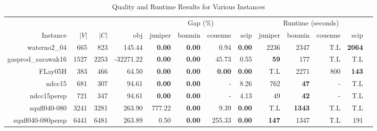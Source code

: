 \begin{landscape} 
\begin{table*}[t] 
\footnotesize 
\caption{Quality and Runtime Results for Various Instances} 
\begin{tabular}{|r|r|r||r||r|r|r|r||r|r|r|r|r|} 
\hline 
                        &     &       &             & \multicolumn{4}{c||}{Gap (\%)} &  \multicolumn{4}{c|}{Runtime (seconds)} \\ 
    Instance              & $|V|$& $|C|$& obj         & juniper    & bonmin & couenne        & scip            & juniper          & bonmin            & couenne         & scip \\ 
    \hline 
    \hline 
                        waterno2\_04 &           665 &           823 &                            145.44 &  \textbf{0.00} &  \textbf{0.00} &           0.94 &  \textbf{0.00} &               2236 &               2347 &                T.L &      \textbf{2064} \\ 
                  gasprod\_sarawak16 &          1527 &          2253 &                         -32271.22 &  \textbf{0.00} &  \textbf{0.00} &          45.73 &           0.55 &        \textbf{59} &                177 &                T.L &                T.L \\ 
                             FLay05H &           383 &           466 &                             64.50 &  \textbf{0.00} &  \textbf{0.00} &  \textbf{0.00} &  \textbf{0.00} &                T.L &               2271 &                800 &       \textbf{143} \\ 
                              ndcc15 &           681 &           307 &                             94.61 &  \textbf{0.00} &  \textbf{0.00} &              - &           8.26 &                762 &        \textbf{47} &                  - &                T.L \\ 
                         ndcc15persp &           721 &           347 &                             94.61 &  \textbf{0.00} &  \textbf{0.00} &              - &           4.13 &                 49 &        \textbf{42} &                  - &                T.L \\ 
                        squfl040-080 &          3241 &          3281 &                            263.90 &         777.22 &  \textbf{0.00} &           9.39 &  \textbf{0.00} &                T.L &      \textbf{1343} &                T.L &                T.L \\ 
                   squfl040-080persp &          6441 &          6481 &                            263.89 &           0.50 &  \textbf{0.00} &         255.33 &  \textbf{0.00} &       \textbf{147} &               1347 &                T.L &                191 \\ 

\end{tabular}
\end{table*}
\end{landscape}
